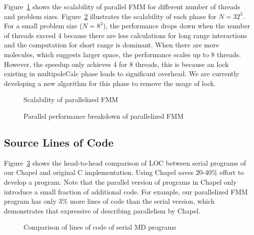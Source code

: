 Figure~\ref{fig:fmm_scale} shows the scalability of parallel \ac{FMM} for
different number of threads and problem sizes.
Figure~\ref{fig:fmm_scale_breakdown} illustrates the scalability of each phase
for $N=32^3$.  For a small problem size (\eg $N=8^3$), the performance drops
down when the number of threads exceed 4 because there are less calculations for
long range interactions and the computation for short range is dominant. When
there are more molecules, which suggests larger space, the performance scales up
to 8 threads. However, the speedup only achieves 4 for 8 threads, this is
because an lock existing in {\ic multipoleCalc} phase leads to significant
overhead. We are currently developing a new algorithm for this phase to remove
the usage of lock.

\begin{figure}[t]
\centering

\caption{Scalability of parallelized \ac{FMM}}
\label{fig:fmm_scale}
\end{figure}

\begin{figure}[t]
\centering

\caption{Parallel performance breakdown of parallelized \ac{FMM}}
\label{fig:fmm_scale_breakdown}
\end{figure}

\subsection{Source Lines of Code}
Figure~\ref{fig:loc} shows the head-to-head comparison of \ac{LOC} between
serial programs of our Chapel and original C implementation. Using Chapel saves
20-40\% effort to develop a program. Note that the parallel version of programs
in Chapel only introduce a small fraction of additional code. For example, our
parallelized \ac{FMM} program has only 3\% more lines of code than the serial
version, which demonstrates that expressive of describing parallelism by Chapel.

\begin{figure}[t]
\centering

\caption{Comparison of lines of code of serial MD programs}
\label{fig:loc}
\end{figure}
